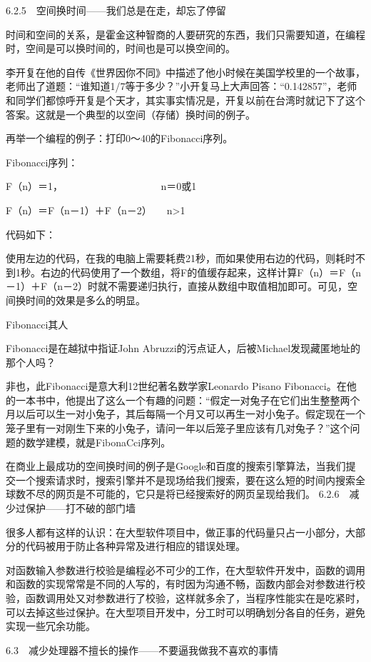 \documentclass[12pt,UTF8]{ctexbook}
\begin{document}
6.2.5　空间换时间——我们总是在走，却忘了停留

时间和空间的关系，是霍金这种智商的人要研究的东西，我们只需要知道，在编程时，空间是可以换时间的，时间也是可以换空间的。

李开复在他的自传《世界因你不同》中描述了他小时候在美国学校里的一个故事，老师出了道题：“谁知道1/7等于多少？”小开复马上大声回答：“0.142857”，老师和同学们都惊呼开复是个天才，其实事实情况是，开复以前在台湾时就记下了这个答案。这就是一个典型的以空间（存储）换时间的例子。

再举一个编程的例子：打印0～40的Fibonacci序列。

Fibonacci序列：

F（n）＝1，　　　　　　　　　　 n＝0或1

F（n）＝F（n－1）＋F（n－2）　　n>1

代码如下：

使用左边的代码，在我的电脑上需要耗费21秒，而如果使用右边的代码，则耗时不到1秒。右边的代码使用了一个数组，将F的值缓存起来，这样计算F（n）＝F（n－1）＋F（n－2）时就不需要递归执行，直接从数组中取值相加即可。可见，空间换时间的效果是多么的明显。

Fibonacci其人

Fibonacci是在越狱中指证John Abruzzi的污点证人，后被Michael发现藏匿地址的那个人吗？

非也，此Fibonacci是意大利12世纪著名数学家Leonardo Pisano Fibonacci。在他的一本书中，他提出了这么一个有趣的问题：“假定一对兔子在它们出生整整两个月以后可以生一对小兔子，其后每隔一个月又可以再生一对小兔子。假定现在一个笼子里有一对刚生下来的小兔子，请问一年以后笼子里应该有几对兔子？”这个问题的数学建模，就是FibonaCci序列。

在商业上最成功的空间换时间的例子是Google和百度的搜索引擎算法，当我们提交一个搜索请求时，搜索引擎并不是现场给我们搜索，要在这么短的时间内搜索全球数不尽的网页是不可能的，它只是将已经搜索好的网页呈现给我们。
6.2.6　减少过保护——打不破的部门墙

很多人都有这样的认识：在大型软件项目中，做正事的代码量只占一小部分，大部分的代码被用于防止各种异常及进行相应的错误处理。

对函数输入参数进行校验是编程必不可少的工作，在大型软件开发中，函数的调用和函数的实现常常是不同的人写的，有时因为沟通不畅，函数内部会对参数进行校验，函数调用处又对参数进行了校验，这样就多余了，当程序性能实在是吃紧时，可以去掉这些过保护。在大型项目开发中，分工时可以明确划分各自的任务，避免实现一些冗余功能。


6.3　减少处理器不擅长的操作——不要逼我做我不喜欢的事情
\end{document}
